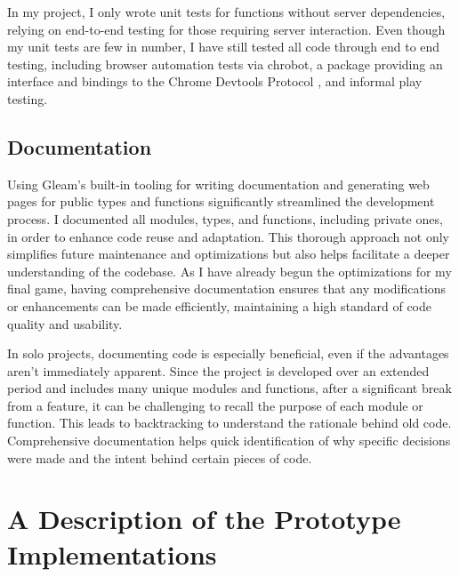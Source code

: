 \documentclass[]{project_interim}
\begin{document}
In my project, I only wrote unit tests for functions without server
dependencies, relying on end-to-end testing for those requiring server interaction.
Even though my unit tests are few in number, I have still tested all code through
end to end testing, including browser automation tests via chrobot, a package providing
an interface and bindings to the Chrome Devtools Protocol \cite{noauthor_chrobot_nodate},
and informal play testing.

\section{Documentation}
Using Gleam's built-in tooling for writing documentation and generating web pages
for public types and functions significantly streamlined the development process.
I documented all modules, types, and functions, including private ones,
in order to enhance code reuse and adaptation. This thorough approach not
only simplifies future maintenance and optimizations but also helps facilitate a
deeper understanding of the codebase. As I have already begun the
optimizations for my final game, having comprehensive documentation
ensures that any modifications or enhancements can be made efficiently,
maintaining a high standard of code quality and usability.

In solo projects, documenting code is especially beneficial, even if the advantages
aren't immediately apparent. Since the project is developed over an extended period
and includes many unique modules and functions, after a significant break from a
feature, it can be challenging to recall the purpose of each module or function.
This leads to backtracking to understand the rationale behind old code.
Comprehensive documentation helps quick identification of why specific decisions
were made and the intent behind certain pieces of code.

\chapter{A Description of the Prototype Implementations}


\end{document}
